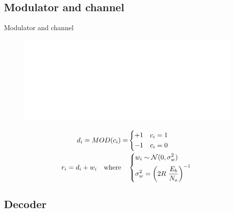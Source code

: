 \documentclass{beamer}
\begin{document}
\begin{darkframes}
  \subsection{Modulator and channel}
  \begin{frame}{Modulator and channel}
    \begin{figure}[h]
      \centering
      \includegraphics{figures/channel.eps}
      \label{fig:channel_model}
    \end{figure}
    \begin{equation*}
      \begin{split}
        d_i
        = MOD(c_i)
        = & \begin{dcases}
          +1 & c_i = 1 \\
          -1 & c_i = 0
        \end{dcases} \\
        r_i
        = d_i + w_i \quad \text{where} ~~~
        & \begin{dcases}
          w_i \sim \mathcal{N}(0, \sigma_w^2) \\
          \sigma_w^2 = \left( 2R~ \frac{E_b}{N_o} \right)^{-1}
        \end{dcases}
      \end{split}
    \end{equation*}
  \end{frame}

  \subsection{Decoder}



\end{darkframes}
\end{document}
